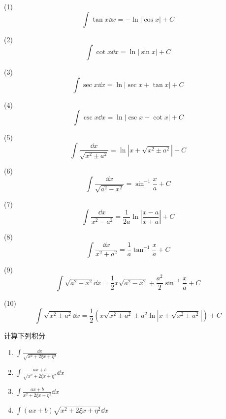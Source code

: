 \begin{proposition}
	(1) $$\int \tan x \dd x = -\ln |\cos x| + C$$
	
	(2) $$\int \cot x \dd x = \ln |\sin x| + C$$
	
	(3) $$\int \sec x \dd x = \ln |\sec x + \tan x| + C$$
	
	(4) $$\int \csc x \dd x = \ln |\csc x - \cot x| + C$$
	
	(5) $$\int \frac{\dd x}{\sqrt{x^2 \pm a^2}} = \ln \left| x + \sqrt{x^2 \pm a^2} \right| + C$$
	
	(6)$$\int \frac{\dd x}{\sqrt{a^2 - x^2}} =  \sin^{-1} \frac{x}{a} + C$$
	
	(7) $$\int \frac{\dd x}{x^2 - a^2} = \frac{1}{2a} \ln \left| \frac{x - a}{x + a} \right| + C$$
	
	(8) $$\int \frac{\dd x}{x^2 + a^2} = \frac{1}{a} \tan^{-1} \frac{x}{a} + C$$
	
	(9) $$\int \sqrt{a^2 - x^2} \dd x = \frac{1}{2} x \sqrt{a^2 - x^2} + \frac{a^2}{2} \sin^{-1} \frac{x}{a} + C$$
	
	(10)$$\int \sqrt{x^2 \pm a^2} \dd x = \frac{1}{2} \left( x \sqrt{x^2 \pm a^2} \pm a^2 \ln \left| x + \sqrt{x^2 \pm a^2} \right| \right) + C$$
\end{proposition}
\begin{problem}计算下列积分
	\begin{enumerate}
		\item[(1)]
		$\displaystyle \int \frac{\dd x}{\sqrt{x^2 + 2\xi x + \eta^2}}$
		
		\item[(2)]
		$\displaystyle \int \frac{ax + b}{\sqrt{x^2 + 2\xi x + \eta^2}} \dd x$
		
		\item[(3)]
		$\displaystyle \int \frac{ax + b}{x^2 + 2\xi x + \eta^2} \dd x$
		
		\item[(4)]
		$\displaystyle \int (ax + b) \sqrt{x^2 + 2\xi x + \eta^2} \dd x$
	\end{enumerate}
	
\end{problem}
